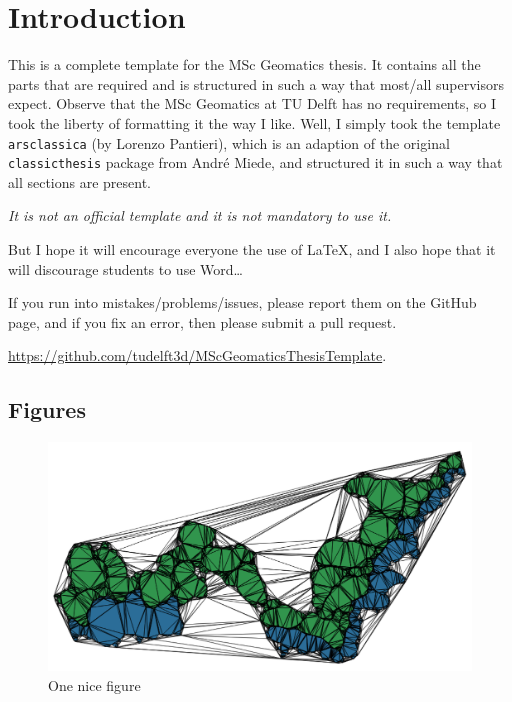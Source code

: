 
\chapter{Introduction}
\label{sec:introduction}


This is a complete template for the MSc Geomatics thesis.
It contains all the parts that are required and is structured in such a way that most/all supervisors expect.
Observe that the MSc Geomatics at TU Delft has no requirements, so I took the liberty of formatting it the way I like. 
Well, I simply took the template \texttt{arsclassica} (by Lorenzo Pantieri), which is an adaption of the original \texttt{classicthesis} package from André Miede, and structured it in such a way that all sections are present.

\emph{It is not an official template and it is not mandatory to use it.}

But I hope it will encourage everyone the use of \LaTeX, and I also hope that it will discourage students to use Word\ldots

If you run into mistakes/problems/issues, please report them on the GitHub page, and if you fix an error, then please submit a pull request. 

\url{https://github.com/tudelft3d/MScGeomaticsThesisTemplate}.



\section{Figures}

\begin{figure}
  \centering
  \includegraphics[width=0.8\linewidth]{figs/sometriangles.png}
  \caption{One nice figure}
\label{fig:sometriangles}
\end{figure}

